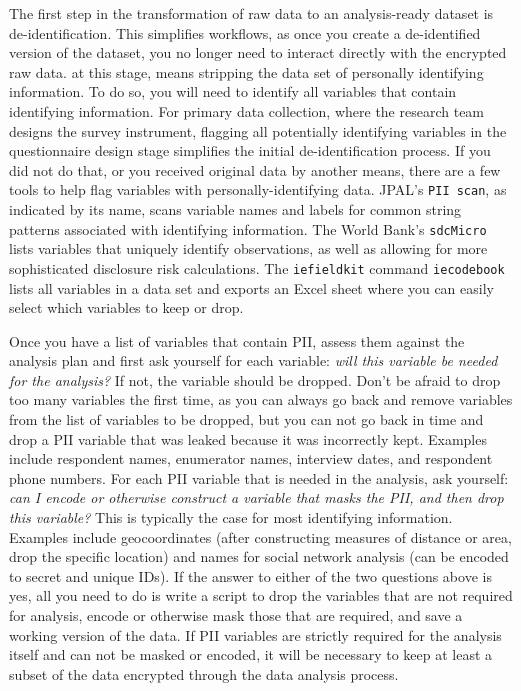 The first step in the transformation of raw data to an analysis-ready dataset is de-identification.
This simplifies workflows, as once you create a de-identified version of the dataset,
you no longer need to interact directly with the encrypted raw data.
at this stage, means stripping the data set of personally identifying information.
To do so, you will need to identify all variables that contain
identifying information.
For primary data collection, where the research team designs the survey instrument,
flagging all potentially identifying variables in the questionnaire design stage
simplifies the initial de-identification process.
If you did not do that, or you received original data by another means,
there are a few tools to help flag variables with personally-identifying data.
JPAL's \texttt{PII scan}, as indicated by its name,
scans variable names and labels for common string patterns associated with identifying information.
The World Bank's \texttt{sdcMicro}
lists variables that uniquely identify observations,
as well as allowing for more sophisticated disclosure risk calculations.
The \texttt{iefieldkit} command \texttt{iecodebook}
lists all variables in a data set and exports an Excel sheet
where you can easily select which variables to keep or drop.

Once you have a list of variables that contain PII,
assess them against the analysis plan and first ask yourself for each variable:
\textit{will this variable be needed for the analysis?}
If not, the variable should be dropped.
Don't be afraid to drop too many variables the first time,
as you can always go back and remove variables from the list of variables to be dropped,
but you can not go back in time and drop a PII variable that was leaked
because it was incorrectly kept.
Examples include respondent names, enumerator names, interview dates, and respondent phone numbers.
For each PII variable that is needed in the analysis, ask yourself:
\textit{can I encode or otherwise construct a variable that masks the PII, and
then drop this variable?}
This is typically the case for most identifying information.
Examples include geocoordinates
(after constructing measures of distance or area,
drop the specific location)
and names for social network analysis (can be encoded to secret and unique IDs).
If the answer to either of the two questions above is yes,
all you need to do is write a script to drop the variables that are not required for analysis,
encode or otherwise mask those that are required,
and save a working version of the data.
If PII variables are strictly required for the analysis itself and can not be
masked or encoded,
it will be necessary to keep at least a subset of the data encrypted through
the data analysis process.

